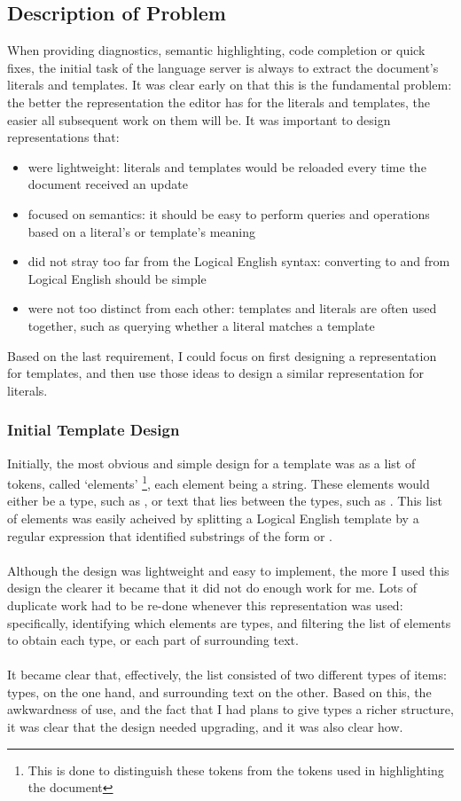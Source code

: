 \documentclass[../main.tex]{subfiles}
\begin{document}
\subsection{Description of Problem}
When providing diagnostics, semantic highlighting, code completion or quick fixes, the initial task of the language server is always to extract the document's literals and templates. It was clear early on that this is the fundamental problem: the better the representation the editor has for the literals and templates, the easier all subsequent work on them will be. It was important to design representations that:
\begin{itemize}
    \item were lightweight: literals and templates would be reloaded every time the document received an update
    \item focused on semantics: it should be easy to perform queries and operations based on a literal's or template's meaning
    \item did not stray too far from the Logical English syntax: converting to and from Logical English should be simple
    \item were not too distinct from each other: templates and literals are often used together, such as querying whether a literal matches a template
\end{itemize}
Based on the last requirement, I could focus on first designing a representation for templates, and then use those ideas to design a similar representation for literals. 

\subsubsection{Initial Template Design}
Initially, the most obvious and simple design for a template was as a list of tokens, called `elements' \footnote{This is done to distinguish these tokens from the tokens used in highlighting the document}, each element being a string. These elements would either be a type, such as , or text that lies between the types, such as . This list of elements was easily acheived by splitting a Logical English template by a regular expression that identified substrings of the form  or . 
\\
\\
Although the design was lightweight and easy to implement, the more I used this design the clearer it became that it did not do enough work for me. Lots of duplicate work had to be re-done whenever this representation was used: specifically, identifying which elements are types, and filtering the list of elements to obtain each type, or each part of surrounding text. 
\\ 
\\
It became clear that, effectively, the list consisted of two different types of items: types, on the one hand, and surrounding text on the other. Based on this, the awkwardness of use, and the fact that I had plans to give types a richer structure, it was clear that the design needed upgrading, and it was also clear how.
\end{document}
